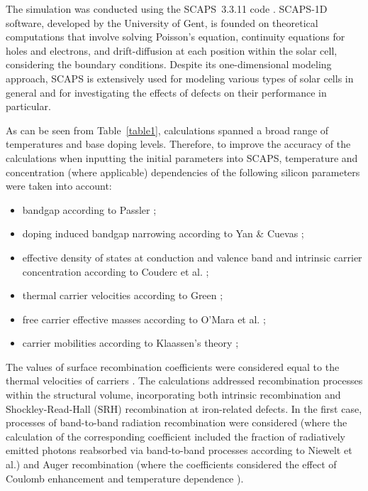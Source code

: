 \documentclass[a4paper,fleqn]{cas-sc}
\begin{document}
The simulation was conducted using the SCAPS~3.3.11 code \cite{SCAPS1}.
SCAPS-1D software, developed by the University of Gent, is founded on theoretical computations that involve solving Poisson's equation,
continuity equations for holes and electrons, and drift-diffusion at each position within the solar cell,
considering the boundary conditions.
Despite its one-dimensional modeling approach, SCAPS is extensively used for modeling various types
of solar cells \cite{MasumMia2025,Rahman2024,Sultana2024,Joshi2024,Ravidas2024,Liu2024,You2023} in general
and for investigating the effects of defects on their performance \cite{MasumMia2025,Sultana2024,AitAbdelkadir2023,Liang2024,SCAPSDefect3} in particular.


As can be seen from Table~\ref{table1}, calculations spanned a broad range of temperatures and base doping levels.
Therefore, to improve the accuracy of the calculations when inputting the initial parameters into SCAPS,
temperature and concentration (where applicable) dependencies of the following silicon parameters were taken into account:

\begin{itemize}
    \item bandgap according to Passler \cite{Passler2002};
    \item doping induced bandgap narrowing according to Yan \& Cuevas \cite{EgNarrow};
    \item effective density of states at conduction and valence band and intrinsic carrier concentration according to Couderc et al. \cite{Si_ni_Couderc};
    \item thermal carrier velocities according to Green \cite{Nc:Green};
    \item free carrier effective masses according to O’Mara et al. \cite{OMara};
    \item carrier mobilities according to Klaassen's theory \cite{KLAASSEN953};
\end{itemize}

The values of surface recombination coefficients were considered equal to the thermal velocities of carriers \cite{Fell2015}.
The calculations addressed recombination processes within the structural volume,
incorporating both intrinsic recombination and Shockley-Read-Hall (SRH) recombination at iron-related defects.
In the first case, processes of band-to-band radiation recombination were considered
(where the calculation of the corresponding coefficient included the fraction of radiatively emitted photons
reabsorbed via band-to-band processes according to Niewelt et al.\cite{Brad2022})
and Auger recombination (where the coefficients considered the effect of Coulomb enhancement \cite{AugerSi2022} and temperature dependence \cite{Si_Auger}).
\end{document}
